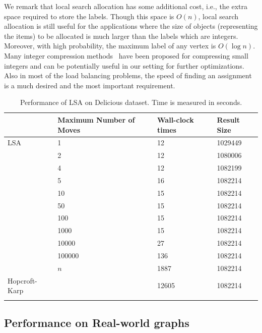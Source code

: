 We remark that local search allocation has some additional cost, i.e., the extra space required to store the labels. Though this space is $O(n)$, local search allocation is still useful for the applications where the size of objects (representing the items) to be allocated is much larger than the labels which are integers. Moreover, with high probability, the maximum label of any vertex is $O(\log n)$. Many integer compression methods~\cite{inp:sgl10} have been proposed for compressing small integers and can be potentially useful in our setting for further optimizations. Also in most of the load balancing problems, the speed of finding an assignment is a much desired and the most important requirement.

\begin{table}[ht!]
\centering
\footnotesize
\begin{tabular}{@{}l l l l @{}}
\toprule
\multicolumn{1}{l}{} & Maximum Number of Moves                  & Wall-clock times     & Result Size  \\
\hline \noalign{\smallskip}
LSA        &   1      & 12    & 1029449  \\
       &   2      & 12    & 1080006  \\
        &   4      & 12    & 1082199  \\
        &   5      & 16    & 1082214  \\
        &   10      & 15    & 1082214  \\
        &   50     & 15    & 1082214  \\
        &   100     & 15    & 1082214  \\
        &   1000     & 15    & 1082214  \\
        &   10000    & 27    & 1082214  \\
        &   100000    & 136    & 1082214  \\
        &   $n$    & 1887    & 1082214  \\
\midrule

Hopcroft-Karp                &  & 12605 & 1082214 \\

\hline \noalign{\smallskip}
\end{tabular}
\caption{Performance of LSA on \textsf{Delicious} dataset. Time is measured in seconds.}
\label{table:softlabel}
\end{table}

\subsection{Performance on Real-world graphs}

